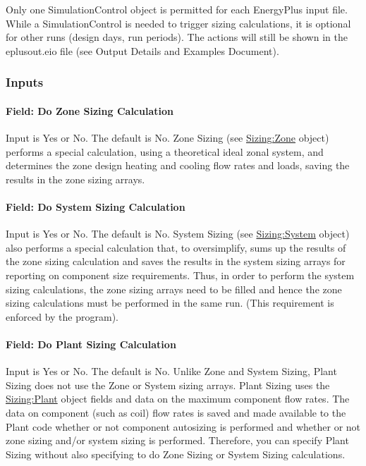 \begin{callout}
    Only one SimulationControl object is permitted for each EnergyPlus input file. While a SimulationControl is needed to trigger sizing calculations, it is optional for other runs (design days, run periods). The actions will still be shown in the eplusout.eio file (see Output Details and Examples Document).
\end{callout}

\subsubsection{Inputs}\label{inputs-15-014}

\paragraph{Field: Do Zone Sizing Calculation}\label{field-do-zone-sizing-calculation}

Input is Yes or No. The default is No. Zone Sizing (see \hyperref[sizingzone]{Sizing:Zone} object) performs a special calculation, using a theoretical ideal zonal system, and determines the zone design heating and cooling flow rates and loads, saving the results in the zone sizing arrays.

\paragraph{Field: Do System Sizing Calculation}\label{field-do-system-sizing-calculation}

Input is Yes or No. The default is No. System Sizing (see \hyperref[sizingsystem]{Sizing:System} object) also performs a special calculation that, to oversimplify, sums up the results of the zone sizing calculation and saves the results in the system sizing arrays for reporting on component size requirements. Thus, in order to perform the system sizing calculations, the zone sizing arrays need to be filled and hence the zone sizing calculations must be performed in the same run. (This requirement is enforced by the program).

\paragraph{Field: Do Plant Sizing Calculation}\label{field-do-plant-sizing-calculation}

Input is Yes or No. The default is No. Unlike Zone and System Sizing, Plant Sizing does not use the Zone or System sizing arrays. Plant Sizing uses the \hyperref[sizingplant]{Sizing:Plant} object fields and data on the maximum component flow rates. The data on component (such as coil) flow rates is saved and made available to the Plant code whether or not component autosizing is performed and whether or not zone sizing and/or system sizing is performed. Therefore, you can specify Plant Sizing without also specifying to do Zone Sizing or System Sizing calculations.

